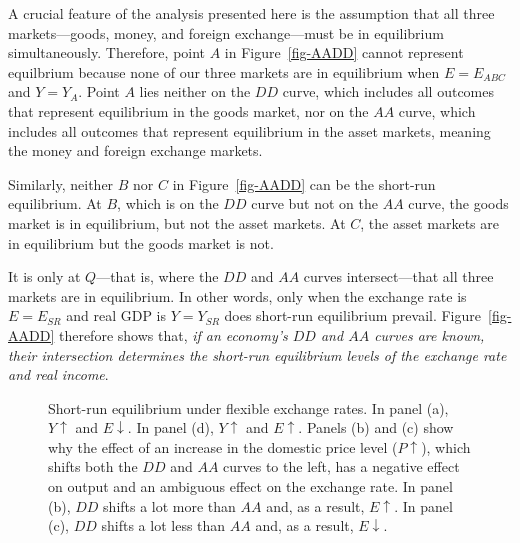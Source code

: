 \documentclass[
  letterpaper,
]{book}
\theoremstyle{plain}
\theoremstyle{remark}
\begin{document}
A crucial feature of the analysis presented here is the assumption that
all three markets---goods, money, and foreign exchange---must be in
equilibrium simultaneously. Therefore, point \(A\) in
Figure~\ref{fig-AADD} cannot represent equilbrium because none of our
three markets are in equilibrium when \(E=E_{ABC}\) and \(Y=Y_A\). Point
\(A\) lies neither on the \(DD\) curve, which includes all outcomes that
represent equilibrium in the goods market, nor on the \(AA\) curve,
which includes all outcomes that represent equilibrium in the asset
markets, meaning the money and foreign exchange markets.

Similarly, neither \(B\) nor \(C\) in Figure~\ref{fig-AADD} can be the
short-run equilibrium. At \(B\), which is on the \(DD\) curve but not on
the \(AA\) curve, the goods market is in equilibrium, but not the asset
markets. At \(C\), the asset markets are in equilibrium but the goods
market is not.

It is only at \(Q\)---that is, where the \(DD\) and \(AA\) curves
intersect---that all three markets are in equilibrium. In other words,
only when the exchange rate is \(E=E_{SR}\) and real GDP is \(Y=Y_{SR}\)
does short-run equilibrium prevail. Figure~\ref{fig-AADD} therefore
shows that, \emph{if an economy's \(DD\) and \(AA\) curves are known,
their intersection determines the short-run equilibrium levels of the
exchange rate and real income}.

\begin{figure}


\caption{\label{fig-AADD-shifts}Short-run equilibrium under flexible
exchange rates. In panel (a), \(Y\uparrow\) and \(E\downarrow\). In
panel (d), \(Y\uparrow\) and \(E\uparrow\). Panels (b) and (c) show why
the effect of an increase in the domestic price level (\(P\uparrow\)),
which shifts both the \(DD\) and \(AA\) curves to the left, has a
negative effect on output and an ambiguous effect on the exchange rate.
In panel (b), \(DD\) shifts a lot more than \(AA\) and, as a result,
\(E\uparrow\). In panel (c), \(DD\) shifts a lot less than \(AA\) and,
as a result, \(E\downarrow\).}

\end{figure}%
\end{document}
